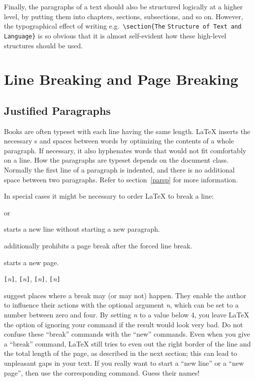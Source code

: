 Finally, the paragraphs of a text should also be structured logically
at a higher level, by putting them into chapters, sections,
subsections, and so on.  However, the typographical effect of writing
e.g.\ \verb|\section{The| \texttt{Structure of Text and Language}\verb|}| is
so obvious that it is almost self-evident how these high-level
structures should be used.

\section{Line Breaking and Page Breaking}
 
\subsection{Justified Paragraphs}

Books are often typeset with each line having the same length.
\LaTeX{} inserts the necessary s and spaces between words
by optimizing the contents of a whole paragraph. If necessary, it
also hyphenates words that would not fit comfortably on a line.
How the paragraphs are typeset depends on the document class.
Normally the first line of a paragraph is indented, and there is no
additional space between two paragraphs. Refer to section~\ref{parsp}
for more information.

In special cases it might be necessary to order \LaTeX{} to break a
line: 
\begin{lscommand}
\ci{\bs} or  
\end{lscommand}
\noindent starts a new line without starting a new paragraph. 

\begin{lscommand}
\ci{\bs*}
\end{lscommand}
\noindent additionally prohibits a page break after the forced
line break. 

\begin{lscommand}
\end{lscommand}
\noindent starts a new page. 

\begin{lscommand}
\verb|[|\emph{n}\verb|]|,
\verb|[|\emph{n}\verb|]|, 
\verb|[|\emph{n}\verb|]|,
\verb|[|\emph{n}\verb|]|
\end{lscommand}
\noindent suggest places where a break may (or may not) happen. They enable the author to influence their
actions with the optional argument \emph{n}, which can be set to a number
between zero and four. By setting \emph{n} to a value below 4, you leave
\LaTeX{} the option of ignoring your command if the result would look very
bad. Do not confuse these ``break'' commands with the ``new'' commands. Even
when you give a ``break'' command, \LaTeX{} still tries to even out the
right border of the line and the total length of the page, as described in
the next section; this can lead to unpleasant gaps in your text.
If you really want to start a ``new line'' or a ``new page'', then use the
corresponding command. Guess their names!


